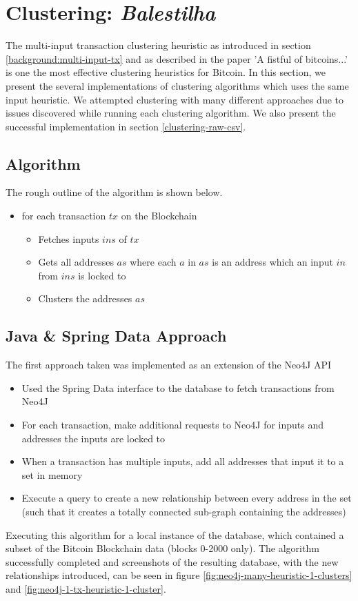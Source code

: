 \chapter{Clustering: \textit{Balestilha}}\label{section-clustering}

The multi-input transaction clustering heuristic as introduced in section \ref{background:multi-input-tx} and as described in the paper 'A fistful of bitcoins...' \cite{Refworks:doc:5c3de7e3e4b0ea6196452d80} is one the most effective clustering heuristics for Bitcoin. In this section, we present the several implementations of clustering algorithms which uses the same input heuristic. We attempted clustering with many different approaches due to issues discovered while running each clustering algorithm. We also present the successful implementation in section \ref{clustering-raw-csv}.

\section{Algorithm}
The rough outline of the algorithm is shown below.
\begin{itemize}
    \item for each transaction $tx$ on the Blockchain
    \begin{itemize}
        \item Fetches inputs $ins$ of $tx$
        \item Gets all addresses $as$ where each $a$ in $as$ is an address which an input  $in$ from $ins$ is locked to
        \item Clusters the addresses $as$
    \end{itemize}
\end{itemize}

\section{Java \& Spring Data Approach}
The first approach taken was implemented as an extension of the Neo4J API 
\begin{itemize}
    \item Used the Spring Data interface to the database to fetch transactions from Neo4J
    \item For each transaction, make additional requests to Neo4J for inputs and addresses the inputs are locked to
    \item When a transaction has multiple inputs, add all addresses that input it to a set in memory 
    \item Execute a query to create a new relationship between every address in the set (such that it creates a totally connected sub-graph containing the addresses)
\end{itemize}
Executing this algorithm for a local instance of the database, which contained a subset of the Bitcoin Blockchain data (blocks 0-2000 only). The algorithm successfully completed and screenshots of the resulting database, with the new relationships introduced, can be seen in figure \ref{fig:neo4j-many-heuristic-1-clusters} and \ref{fig:neo4j-1-tx-heuristic-1-cluster}. 

